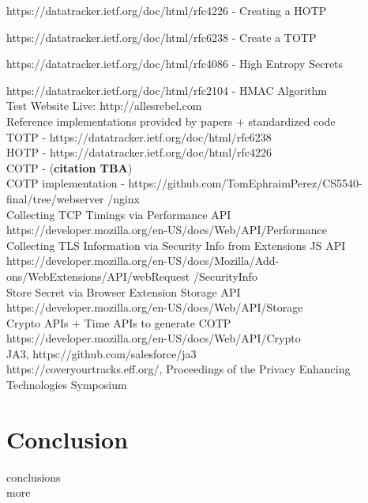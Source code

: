 \documentclass[a4paper, 11pt]{article} 				%
\begin{document}
\noindent
https://datatracker.ietf.org/doc/html/rfc4226 - Creating a HOTP

\noindent
https://datatracker.ietf.org/doc/html/rfc6238 - Create a TOTP 

\noindent
https://datatracker.ietf.org/doc/html/rfc4086 - High Entropy Secrets

\noindent
https://datatracker.ietf.org/doc/html/rfc2104 - HMAC Algorithm\\

\noindent
Test Website Live: http://allesrebel.com\\ 

\noindent
Reference implementations provided by papers + standardized code\\
TOTP - https://datatracker.ietf.org/doc/html/rfc6238\\
HOTP - https://datatracker.ietf.org/doc/html/rfc4226 \\
COTP - (\textbf{citation TBA})\\
COTP implementation - https://github.com/TomEphraimPerez/CS5540-final/tree/webserver /nginx\\

\noindent
Collecting TCP Timings via Performance API\\
https://developer.mozilla.org/en-US/docs/Web/API/Performance\\
Collecting TLS Information via Security Info from Extensions JS API\\
https://developer.mozilla.org/en-US/docs/Mozilla/Add-ons/WebExtensions/API/webRequest /SecurityInfo\\

\noindent
Store Secret via Browser Extension Storage API\\
https://developer.mozilla.org/en-US/docs/Web/API/Storage\\

\noindent
Crypto APIs + Time APIs to generate COTP\\
https://developer.mozilla.org/en-US/docs/Web/API/Crypto\\


\noindent
JA3, https://github.com/salesforce/ja3\\

\noindent
https://coveryourtracks.eff.org/, Proceedings of the Privacy Enhancing Technologies Symposium



\section{Conclusion}
conclusions\\
more\\
\end{document}
